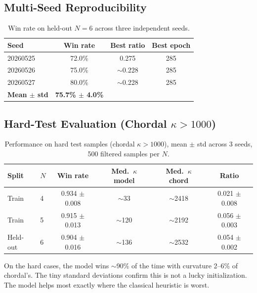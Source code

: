 \documentclass[11pt, a4paper]{article}
\begin{document}
\subsection{Multi-Seed Reproducibility}

\begin{table}[t]
\centering
\caption{%
  Win rate on held-out $N = 6$ across three independent seeds.%
}
\label{tab:seeds}
\begin{tabular}{lccc}
\toprule
\textbf{Seed} & \textbf{Win rate} & \textbf{Best ratio} &
  \textbf{Best epoch} \\
\midrule
20260525 & 72.0\% & 0.275 & 285 \\
20260526 & 75.0\% & $\sim$0.228 & 285 \\
20260527 & 80.0\% & $\sim$0.228 & 285 \\
\midrule
\textbf{Mean $\pm$ std} & \textbf{75.7\% $\pm$ 4.0\%} & & \\
\bottomrule
\end{tabular}
\end{table}


\subsection{Hard-Test Evaluation (Chordal $\kappa > 1000$)}

\begin{table}[t]
\centering
\caption{%
  Performance on hard test samples (chordal $\kappa > 1000$), mean $\pm$
  std across 3 seeds, 500 filtered samples per $N$.%
}
\label{tab:hard}
\begin{tabular}{llcccc}
\toprule
\textbf{Split} & $N$ &
  \textbf{Win rate} & \textbf{Med.\ $\kappa$ model} &
  \textbf{Med.\ $\kappa$ chord} & \textbf{Ratio} \\
\midrule
Train     & 4 & 0.934 $\pm$ 0.008 & $\sim$33  & $\sim$2418 &
  0.021 $\pm$ 0.008 \\
Train     & 5 & 0.915 $\pm$ 0.013 & $\sim$120 & $\sim$2192 &
  0.056 $\pm$ 0.003 \\
Held-out  & 6 & 0.904 $\pm$ 0.016 & $\sim$136 & $\sim$2532 &
  0.054 $\pm$ 0.002 \\
\bottomrule
\end{tabular}
\end{table}

On the hard cases, the model wins $\sim$90\% of the time with curvature
2--6\% of chordal's. The tiny standard deviations confirm this is not a
lucky initialization. The model helps most exactly where the classical
heuristic is worst.
\end{document}
